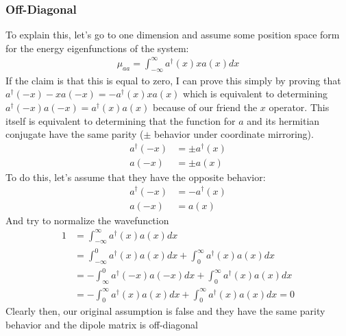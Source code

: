 \subsubsection{Off-Diagonal}
To explain this, let's go to one dimension and assume some position space form for the energy eigenfunctions of the system:
\begin{align}
	\mu_{aa} = \int_{-\infty}^{\infty} a^{\dagger}(x) x a(x) dx
\end{align}
If the claim is that this is equal to zero, I can prove this simply by proving that $a^{\dagger}(-x) -x a(-x) = -a^{\dagger}(x) x a(x)$ which is equivalent  to determining $a^{\dagger}(-x) a(-x) = a^{\dagger}(x) a(x)$ because of our friend the $x$ operator.  This itself is equivalent to determining that the function for $a$ and its hermitian conjugate have the same parity ($\pm$ behavior under coordinate mirroring).
\begin{align}
	a^{\dagger}(-x)  &= \pm a^{\dagger}(x)  \\
	a(-x) &= \pm a(x)
\end{align}
To do this, let's assume that they have the opposite behavior:
\begin{align}
	a^{\dagger}(-x)  &= - a^{\dagger}(x)  \\
	a(-x) &=  a(x)
\end{align}
And try to normalize the wavefunction
\begin{align}
	1 &= \int_{-\infty}^{\infty} a^{\dagger}(x) a(x) dx \\
		&= \int_{-\infty}^{0} a^{\dagger}(x) a(x) dx + \int_{0}^{\infty} a^{\dagger}(x) a(x) dx \\
		&= -\int_{\infty}^{0} a^{\dagger}(-x) a(-x) dx + \int_{0}^{\infty} a^{\dagger}(x) a(x) dx \\
		&= -\int_{0}^{\infty} a^{\dagger}(x) a(x) dx + \int_{0}^{\infty} a^{\dagger}(x) a(x) dx  = 0
\end{align}
Clearly then, our original assumption is false and they have the same parity behavior and the dipole matrix is off-diagonal

